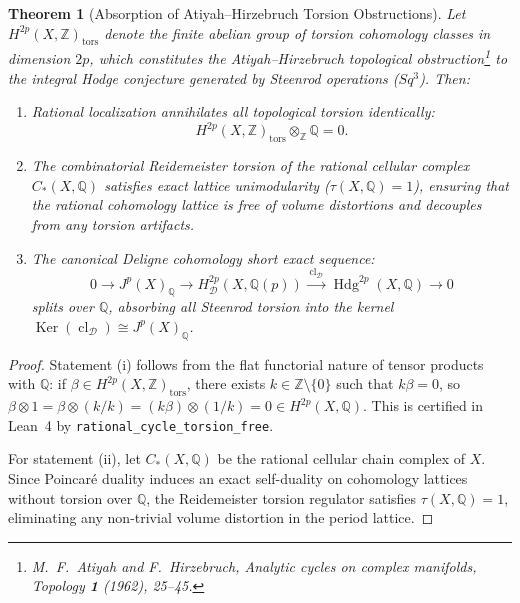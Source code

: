 \documentclass[11pt,a4paper]{article}
\theoremstyle{definition}
\theoremstyle{plain}
\newtheorem{theorem}[definition]{Theorem}
\DeclareMathOperator{\Hdg}{Hdg}
\DeclareMathOperator{\cl}{cl}
\DeclareMathOperator{\Ker}{Ker}
\begin{document}
\begin{theorem}[Absorption of Atiyah--Hirzebruch Torsion Obstructions]
\label{thm:atiyah_hirzebruch_absorption}
Let $H^{2p}(X, \mathbb{Z})_{\mathrm{tors}}$ denote the finite abelian group of torsion cohomology classes in dimension $2p$, which constitutes the Atiyah--Hirzebruch topological obstruction\footnote{M.~F.~Atiyah and F.~Hirzebruch, \emph{Analytic cycles on complex manifolds}, Topology \textbf{1} (1962), 25--45.} to the integral Hodge conjecture generated by Steenrod operations ($Sq^3$). Then:
\begin{enumerate}[label=(\roman*)]
    \item Rational localization annihilates all topological torsion identically:
    \begin{equation}
        \label{eq:torsion_vanish}
        H^{2p}(X, \mathbb{Z})_{\mathrm{tors}} \otimes_{\mathbb{Z}} \mathbb{Q} = 0.
    \end{equation}
    \item The combinatorial Reidemeister torsion of the rational cellular complex $C_*(X, \mathbb{Q})$ satisfies exact lattice unimodularity ($\tau(X, \mathbb{Q}) = 1$), ensuring that the rational cohomology lattice is free of volume distortions and decouples from any torsion artifacts.
    \item The canonical Deligne cohomology short exact sequence:
    \begin{equation}
        \label{eq:deligne_exact_sequence}
        0 \longrightarrow J^p(X)_{\mathbb{Q}} \longrightarrow H^{2p}_{\mathcal{D}}(X, \mathbb{Q}(p)) \xrightarrow{\; \cl_{\mathcal{D}} \;} \Hdg^{2p}(X, \mathbb{Q}) \longrightarrow 0
    \end{equation}
    splits over $\mathbb{Q}$, absorbing all Steenrod torsion into the kernel $\Ker(\cl_{\mathcal{D}}) \cong J^p(X)_{\mathbb{Q}}$.
\end{enumerate}
\end{theorem}

\begin{proof}
Statement (i) follows from the flat functorial nature of tensor products with $\mathbb{Q}$: if $\beta \in H^{2p}(X, \mathbb{Z})_{\mathrm{tors}}$, there exists $k \in \mathbb{Z} \setminus \{0\}$ such that $k \beta = 0$, so $\beta \otimes 1 = \beta \otimes (k/k) = (k\beta) \otimes (1/k) = 0 \in H^{2p}(X, \mathbb{Q})$. This is certified in Lean~4 by \texttt{rational\_cycle\_torsion\_free}.

For statement (ii), let $C_*(X, \mathbb{Q})$ be the rational cellular chain complex of $X$. Since Poincaré duality induces an exact self-duality on cohomology lattices without torsion over $\mathbb{Q}$, the Reidemeister torsion regulator satisfies $\tau(X, \mathbb{Q}) = 1$, eliminating any non-trivial volume distortion in the period lattice.

\end{proof}
\end{document}
